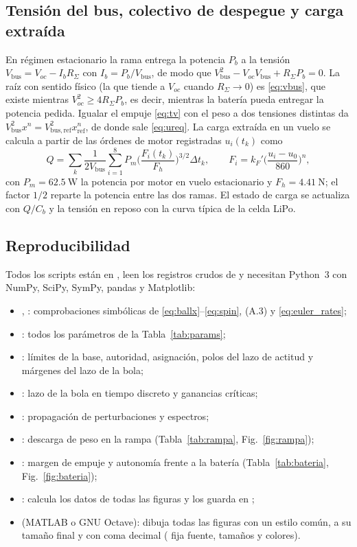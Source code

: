 \subsection{Tensión del bus, colectivo de despegue y carga extraída}
En régimen estacionario la rama entrega la potencia $P_b$ a la tensión $V_{\mathrm{bus}}=V_{oc}-I_bR_\Sigma$ con $I_b=P_b/V_{\mathrm{bus}}$, de modo que $V_{\mathrm{bus}}^2-V_{oc}V_{\mathrm{bus}}+R_\Sigma P_b=0$. La raíz con sentido físico (la que tiende a $V_{oc}$ cuando $R_\Sigma\to0$) es \eqref{eq:vbus}, que existe mientras $V_{oc}^2\ge4R_\Sigma P_b$, es decir, mientras la batería pueda entregar la potencia pedida. Igualar el empuje \eqref{eq:tv} con el peso a dos tensiones distintas da $V_{\mathrm{bus}}^2x^n=V_{\mathrm{bus,ref}}^2x_{\mathrm{ref}}^n$, de donde sale \eqref{eq:ureq}. La carga extraída en un vuelo se calcula a partir de las órdenes de motor registradas $u_i(t_k)$ como
\begin{equation}
  Q=\sum_k\frac{1}{2V_{\mathrm{bus}}}\sum_{i=1}^{8}P_m\Big(\frac{F_i(t_k)}{F_h}\Big)^{3/2}\Delta t_k,\qquad F_i=k_F'\Big(\frac{u_i-u_0}{860}\Big)^n,
  \tag{A.4}
\end{equation}
con $P_m=\SI{62.5}{\watt}$ la potencia por motor en vuelo estacionario y $F_h=\SI{4.41}{\newton}$; el factor $1/2$ reparte la potencia entre las dos ramas. El estado de carga se actualiza con $Q/C_b$ y la tensión en reposo con la curva típica de la celda LiPo.

\subsection{Reproducibilidad}
Todos los scripts están en , leen los registros crudos de  y necesitan Python~3 con NumPy, SciPy, SymPy, pandas y Matplotlib:
\begin{itemize}
  \item {}, : comprobaciones simbólicas de \eqref{eq:ballx}--\eqref{eq:spin}, (A.3) y \eqref{eq:euler_rates};
  \item {}: todos los parámetros de la Tabla~\ref{tab:params};
  \item {}: límites de la base, autoridad, asignación, polos del lazo de actitud y márgenes del lazo de la bola;
  \item {}: lazo de la bola en tiempo discreto y ganancias críticas;
  \item {}: propagación de perturbaciones y espectros;
  \item {}: descarga de peso en la rampa (Tabla~\ref{tab:rampa}, Fig.~\ref{fig:rampa});
  \item {}: margen de empuje y autonomía frente a la batería (Tabla~\ref{tab:bateria}, Fig.~\ref{fig:bateria});
  \item {}: calcula los datos de todas las figuras y los guarda en ;
  \item {} (MATLAB o GNU Octave): dibuja todas las figuras con un estilo común, a su tamaño final y con coma decimal ( fija fuente, tamaños y colores).
\end{itemize}
